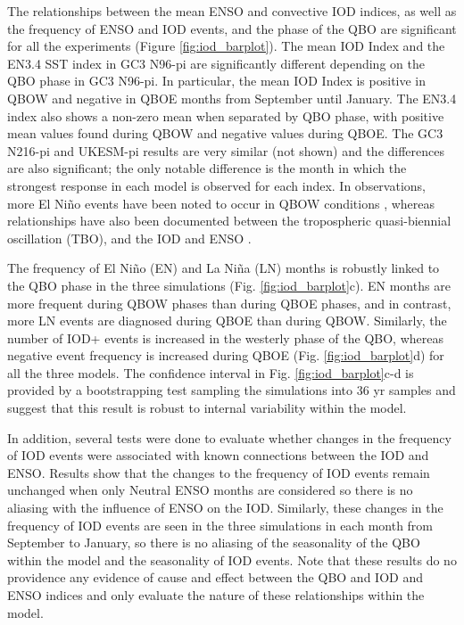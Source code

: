 The relationships between the mean ENSO and convective IOD indices, as well as the frequency of ENSO and IOD events, and the phase of the QBO are significant for all the experiments (Figure \ref{fig:iod_barplot}). 
The mean IOD Index and the EN3.4 SST index in GC3 N96-pi are significantly different depending on the QBO phase in GC3 N96-pi. In particular, the mean IOD Index is positive in QBOW and negative in QBOE months from September until January. The EN3.4 index also shows a non-zero mean when separated by QBO phase, with positive mean values found during QBOW and negative values during QBOE. 
The GC3 N216-pi and UKESM-pi results are very similar (not shown) and the differences are also significant; the only notable difference is the month in which the strongest response in each model is observed for each index. 
In observations, more El Niño events have been noted to occur in QBOW conditions \citep{christiansen2016}, whereas relationships have also been documented between the tropospheric quasi-biennial oscillation (TBO), and the IOD and ENSO \citep[e.g.][]{pillai2010}.

The frequency of El Niño (EN) and La Niña (LN) months is robustly linked to the QBO phase in the three simulations (Fig. \ref{fig:iod_barplot}c). 
EN months are more frequent during QBOW phases than during QBOE phases, and in contrast, more LN events are diagnosed during QBOE than during QBOW. 
Similarly, the number of IOD+ events is increased in the westerly phase of the QBO, whereas negative event frequency is increased during QBOE (Fig. \ref{fig:iod_barplot}d) for all the three models. 
The confidence interval in Fig.  \ref{fig:iod_barplot}c-d  is provided by a bootstrapping test sampling the simulations into 36 yr samples and suggest that this result is robust to internal variability within the model. 


In addition, several tests were done to evaluate whether changes in the frequency of IOD events were associated with known connections between the IOD and ENSO. 
Results show that the changes to the frequency of IOD events remain unchanged when only Neutral ENSO months are considered so there is no aliasing with the influence of ENSO on the IOD. Similarly, these changes in the frequency of IOD events are seen in the three simulations in each month from September to January, so there is no aliasing of the seasonality of the QBO within the model and the seasonality of IOD events. 
Note that these results do no providence any evidence of cause and effect between the QBO and IOD and ENSO indices and only evaluate the nature of these relationships within the model.

